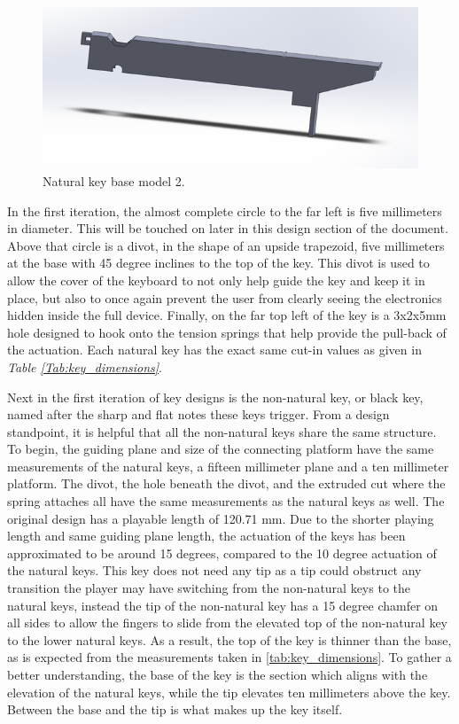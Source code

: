 \begin{figure}[h!]
  \centering
  \includegraphics[width=0.8\linewidth]{image/WhiteModel2.png}
  \caption{Natural key base model 2.}
  \label{fig:white_model2}
\end{figure}

In the first iteration, the almost complete circle to the far left is five millimeters in diameter. This will be touched on later in this design section of the document. Above that circle is a divot, in the shape of an upside trapezoid, five millimeters at the base with 45 degree inclines to the top of the key. This divot is used to allow the cover of the keyboard to not only help guide the key and keep it in place, but also to once again prevent the user from clearly seeing the electronics hidden inside the full device. Finally, on the far top left of the key is a 3x2x5mm hole designed to hook onto the tension springs that help provide the pull-back of the actuation. Each natural key has the exact same cut-in values as given in \textit{Table \ref{Tab:key_dimensions}}.

Next in the first iteration of key designs is the non-natural key, or black key, named after the sharp and flat notes these keys trigger. From a design standpoint, it is helpful that all the non-natural keys share the same structure. To begin, the guiding plane and size of the connecting platform have the same measurements of the natural keys, a fifteen millimeter plane and a ten millimeter platform. The divot, the hole beneath the divot, and the extruded cut where the spring attaches all have the same measurements as the natural keys as well. The original design has a playable length of 120.71 mm. Due to the shorter playing length and same guiding plane length, the actuation of the keys has been approximated to be around 15 degrees, compared to the 10 degree actuation of the natural keys. This key does not need any tip as a tip could obstruct any transition the player may have switching from the non-natural keys to the natural keys, instead the tip of the non-natural key has a 15 degree chamfer on all sides to allow the fingers to slide from the elevated top of the non-natural key to the lower natural keys. As a result, the top of the key is thinner than the base, as is expected from the measurements taken in \autoref{tab:key_dimensions}. To gather a better understanding, the base of the key is the section which aligns with the elevation of the natural keys, while the tip elevates ten millimeters above the key. Between the base and the tip is what makes up the key itself.

